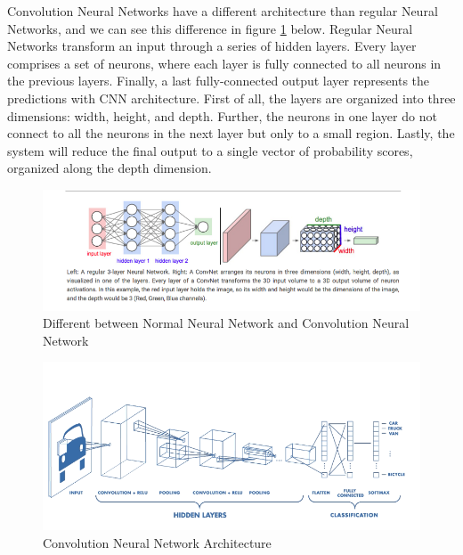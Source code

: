 Convolution Neural Networks have a different architecture than regular Neural Networks, and we can see this difference in figure \ref{fig:Chap3-DiffArchCNN_NNN} below. Regular Neural Networks transform an input through a series of hidden layers. Every layer comprises a set of neurons, where each layer is fully connected to all neurons in the previous layers. Finally, a last fully-connected output layer represents the predictions with CNN architecture. First of all, the layers are organized into three dimensions: width, height, and depth. Further, the neurons in one layer do not connect to all the neurons in the next layer but only to a small region. Lastly, the system will reduce the final output to a single vector of probability scores, organized along the depth dimension.

\begin{figure}[H]
	\centering
	\includegraphics[width=\textwidth]{img/Chap3/DiffArchCNN-ANN}
	\caption{Different between Normal Neural Network and Convolution Neural Network}
	\label{fig:Chap3-DiffArchCNN_NNN}
\end{figure}

\begin{figure}[H]
	\centering
	\includegraphics[width=\textwidth]{img/Chap3/CNN-Arch}
	\caption{Convolution Neural Network Architecture}
	\label{fig:Chap3-CNN_Arch}
\end{figure}

